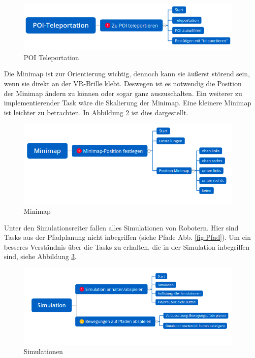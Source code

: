 \documentclass{TUBAFarbeiten}
\begin{document}
\begin{figure}
	\centering
	\includegraphics[width=\linewidth]{POI.png}
	\caption{POI Teleportation}
	\label{fig:POI}
\end{figure}

Die Minimap ist zur Orientierung wichtig, dennoch kann sie äußerst störend sein, wenn sie direkt an der VR-Brille klebt. Deswegen ist es notwendig die Position der Minimap ändern zu können oder sogar ganz auszuschalten. Ein weiterer zu implementierender Task wäre die Skalierung der Minimap. Eine kleinere Minimap ist leichter zu betrachten. In Abbildung \ref{fig:mini} ist dies dargestellt.\\

\begin{figure}
	\centering
	\includegraphics[width=\linewidth]{minimap.png}
	\caption{Minimap}
	\label{fig:mini}
\end{figure}

Unter den Simulationsreiter fallen alles Simulationen von Robotern. Hier sind Tasks aus der Pfadplanung nicht inbegriffen (siehe Pfade Abb. \ref{fig:Pfad}). Um ein besseres Verständnis über die Tasks zu erhalten, die in der Simulation inbegriffen sind, siehe Abbildung \ref{fig:Sim}.\\

\begin{figure}
	\centering
	\includegraphics[width=\linewidth]{sim.png}
	\caption{Simulationen}
	\label{fig:Sim}
\end{figure}
\end{document}
